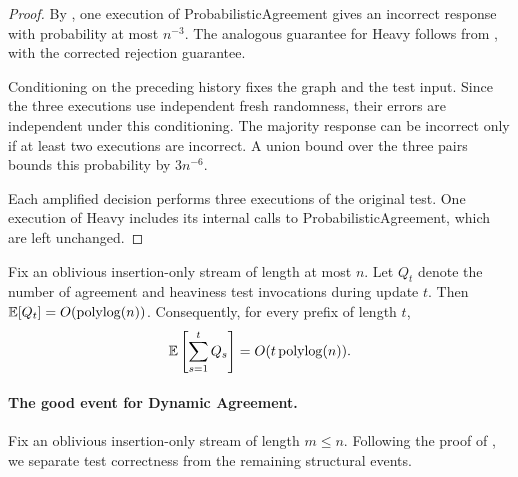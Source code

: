 \begin{proof}
    By \cite[Lemmas~49 and~50]{CLMP2024Dynamic}, one execution of ProbabilisticAgreement gives an incorrect response with probability at most $ n^{-3} $.
    The analogous guarantee for Heavy follows from \cite[Lemmas~52 and~53]{CLMP2024Dynamic}, with the corrected rejection guarantee.

    Conditioning on the preceding history fixes the graph and the test input.
    Since the three executions use independent fresh randomness, their errors are independent under this conditioning.
    The majority response can be incorrect only if at least two executions are incorrect.
    A union bound over the three pairs bounds this probability by $ 3n^{-6} $.

    Each amplified decision performs three executions of the original test.
    One execution of Heavy includes its internal calls to ProbabilisticAgreement, which are left unchanged.
\end{proof}

\begin{lemma}
    \label{lem:da.test.count}
    Fix an oblivious insertion-only stream of length at most $ n $.
    Let $ Q_t $ denote the number of agreement and heaviness test invocations during update $ t $.
    Then $ \mathbb E[Q_t]=O(\operatorname{polylog}(n)) $.
    Consequently, for every prefix of length $ t $,
    \begin{align}
        \mathbb E\left[\sum_{s=1}^{t}Q_s\right]
        =O(t\operatorname{polylog}(n)).
    \end{align}
\end{lemma}

\paragraph{The good event for Dynamic Agreement.}
Fix an oblivious insertion-only stream of length $ m\le n $.
Following the proof of \cite[Theorem~6]{CLMP2024Dynamic}, we separate test correctness from the remaining structural events.

